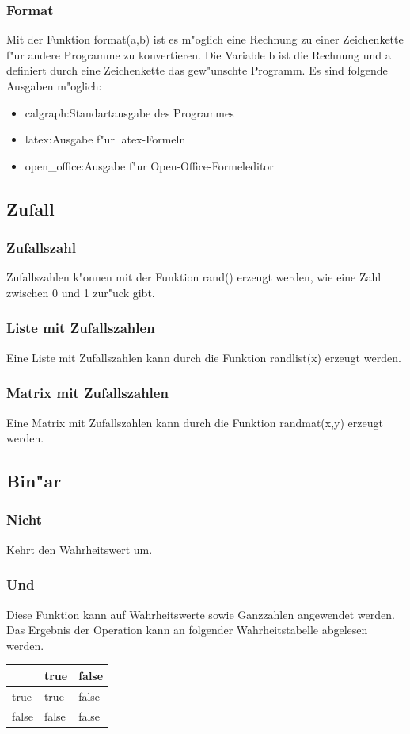 \documentclass{scrartcl}
\begin{document}
\subsubsection{Format}
Mit der Funktion format(a,b) ist es m"oglich eine Rechnung zu einer Zeichenkette f"ur andere Programme zu konvertieren. Die Variable b ist die Rechnung und a definiert durch eine Zeichenkette das gew"unschte Programm. Es sind folgende Ausgaben m"oglich:
\begin{itemize}
\item \grqq calgraph\grqq :Standartausgabe des Programmes
\item \grqq latex\grqq :Ausgabe f"ur latex-Formeln
\item \grqq open\_office\grqq :Ausgabe f"ur Open-Office-Formeleditor
\end{itemize}
\subsection{Zufall}
\subsubsection{Zufallszahl}
Zufallszahlen k"onnen mit der Funktion rand() erzeugt werden, wie eine Zahl zwischen 0 und 1 zur"uck gibt.
\subsubsection{Liste mit Zufallszahlen}
Eine Liste mit Zufallszahlen kann durch die Funktion randlist(x) erzeugt werden.
\subsubsection{Matrix mit Zufallszahlen}
Eine Matrix mit Zufallszahlen kann durch die Funktion randmat(x,y) erzeugt werden.
\subsection{Bin"ar}
\subsubsection{Nicht}
\label{chp:Nicht}
Kehrt den Wahrheitswert um.
\subsubsection{Und}
\label{chp:Und}
Diese Funktion kann auf Wahrheitswerte sowie Ganzzahlen angewendet werden. Das Ergebnis der Operation kann an folgender Wahrheitstabelle abgelesen werden.\newline
\begin{tabular}[b]{|l|l|l|}\hline
 &  true & false \\\hline
true & true & false \\\hline
false & false & false \\\hline
\end{tabular}
\end{document}

